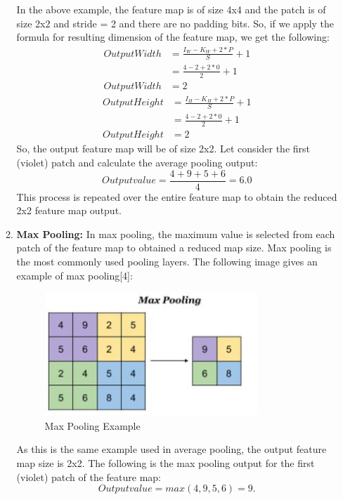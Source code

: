 \documentclass{IEEEtran}
\begin{document}
\begin{enumerate}
\begin{enumerate}
In the above example, the feature map is of size 4x4 and the patch is of size 2x2 and stride = 2 and there are no padding bits. So, if we apply the formula for resulting dimension of the feature map, we get the following:
\begin{equation*}
\begin{aligned}
Output Width &= \frac{I_W - K_W + 2*P}{S} + 1 \\
			&= \frac{4 - 2 + 2*0}{2} + 1 \\
Output Width&= 2 
\end{aligned} 
\end{equation*}
\begin{equation*}
\begin{aligned}
Output Height &= \frac{I_H - K_H + 2*P}{S} + 1 \\
			&= \frac{4 - 2 + 2*0}{2} + 1 \\
Output Height&= 2 
\end{aligned} 
\end{equation*}
So, the output feature map will be of size 2x2. Let consider the first (violet) patch and calculate the average pooling output:
\begin{equation*}
Output value = \frac{4 + 9 + 5 + 6}{4} = 6.0
\end{equation*}
This process is repeated over the entire feature map to obtain the reduced 2x2 feature map output.

\item \textbf{Max Pooling:} In max pooling, the maximum value is selected from each patch of the feature map to obtained a reduced map size. Max pooling is the most commonly used pooling layers.  The following image gives an example of max pooling[4]:
 
\begin{figure}[h]
    \centering
    \captionsetup{justification=centering}
    \includegraphics[width=8cm]{maxpool}
    \caption{Max Pooling Example}
    \label{fig:Max Pooling Example}
\end{figure}

As this is the same example used in average pooling, the output feature map size is 2x2. The following is the max pooling output for the first (violet) patch of the feature map:
\begin{equation*}
Output value = max(4,9,5,6) = 9.
\end{equation*}
\end{enumerate}
\end{enumerate}
\end{document}
